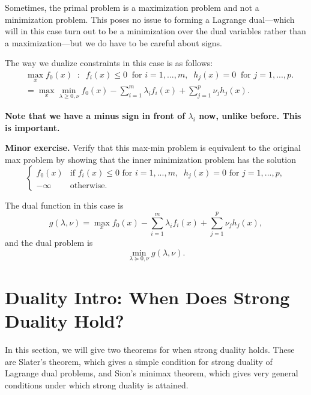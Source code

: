\documentclass[12pt]{article}
\begin{document}
Sometimes, the primal problem is a maximization problem and not a minimization problem. This poses no issue to forming a Lagrange dual---which will in this case turn out to be a minimization over the dual variables rather than a maximization---but we do have to be careful about signs.

The way we dualize constraints in this case is as follows:
%
\begin{align*}
& \max_x f_0(x) \;\; : \;\; f_i (x) \leq 0 \;\; \text{for } i=1,..., m, \;\; h_j (x) = 0 \;\; \text{for } j=1,..., p. \\
&= \max_x \min_{\lambda \geq 0, \nu} f_0(x) - \sum_{i=1}^m \lambda_i f_i(x) + \sum_{j=1}^p \nu_j h_j (x).
\end{align*}

\textbf{Note that we have a minus sign in front of $\lambda_i$ now, unlike before. This is important.}

\textbf{Minor exercise.} Verify that this max-min problem is equivalent to the original max problem by showing that the inner minimization problem has the solution
%
\begin{equation*}
\left\{\begin{array}{ll}
f_0 (x) & \text{if } f_i (x) \leq 0 \text{ for } i=1,..., m, \;\; h_j(x) = 0 \text{ for } j=1,..., p, \\
-\infty & \text{otherwise}.
\end{array}\right.
\end{equation*}

The dual function in this case is
%
\begin{equation*}
g(\lambda, \nu) = \max_x f_0(x) - \sum_{i=1}^m \lambda_i f_i(x) + \sum_{j=1}^p \nu_j h_j (x),
\end{equation*}
%
and the dual problem is
%
\begin{equation*}
\min_{\lambda \succeq 0, \nu} g(\lambda, \nu).
\end{equation*}

\pagebreak

\section{Duality Intro: When Does Strong Duality Hold?}


In this section, we will give two theorems for when strong duality holds. These are Slater's theorem, which gives a simple condition for strong duality of Lagrange dual problems, and Sion's minimax theorem, which gives very general conditions under which strong duality is attained. 
\end{document}
